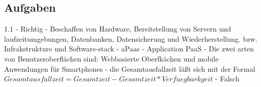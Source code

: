 \documentclass[a4paper,10pt]{article}
\begin{document}
\subsection{Aufgaben}
1.1 - Richtig  - Beschaffen von Hardware, Bereitstellung von Servern und laufzeitumgebungen, Datenbanken, Datensicherung und Wiederherstellung. bzw. Infrakstrukture und Software-stack  - aPaas - Application PaaS  - Die zwei arten von Benutzeroberflächen sind:  Webbasierte Oberfkächen und mobile Anwendungen für Smartphones - die Gesamtausfallzeit läßt sich mit der Formal $ Gesamtausfallzeit = Gesamtzeit - Gesamtzeit * Verfuegbarkgeit $  - Falsch \newline
\end{document}
